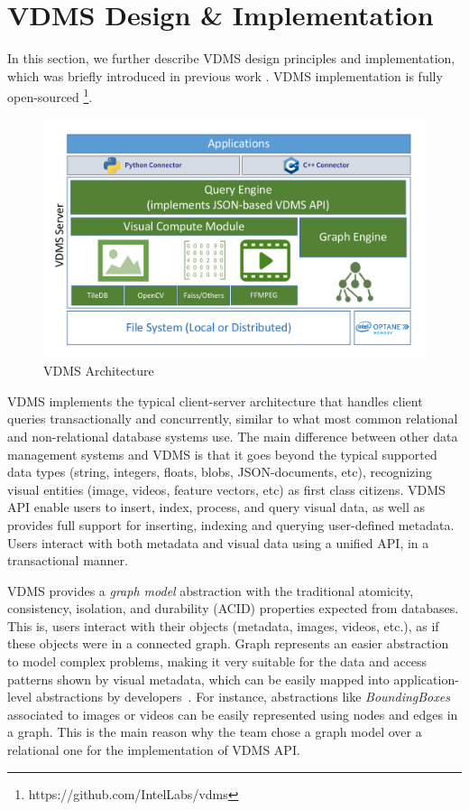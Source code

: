 \section{VDMS Design \& Implementation}
\label{arch}

In this section, we further describe VDMS design principles and implementation,
which was briefly introduced in previous work \cite{vdms-nips}.
VDMS implementation is fully open-sourced
\footnote{https://github.com/IntelLabs/vdms}.

\begin{figure}
\centering
\includegraphics[width=1\columnwidth]{figures/vdms_arch.pdf}
\caption{VDMS Architecture}
\label{fig:arch}
\end{figure}

VDMS implements the typical client-server architecture that handles
client queries transactionally and concurrently, similar to what most common
relational and non-relational database systems
\cite{mysql, postgresql, chang2008bigtable} use.
The main difference between other data management systems and VDMS is that
it goes beyond the typical supported data types (string, integers, floats,
blobs, JSON-documents, etc), recognizing visual entities (image, videos,
feature vectors, etc) as first class citizens.
VDMS API enable users to insert, index, process, and query visual data,
as well as provides full support for inserting, indexing and querying
user-defined metadata.
Users interact with both metadata and visual data using a unified API,
in a transactional manner.

VDMS provides a \textit{graph model} abstraction with the traditional
atomicity, consistency, isolation, and durability
(ACID) properties expected from databases.
This is, users interact with their objects (metadata, images, videos, etc.),
as if these objects were in a connected graph.
Graph represents an easier abstraction to model complex problems,
making it very suitable for the data and access patterns shown by visual metadata,
which can be easily mapped into application-level abstractions by
developers~\cite{tao}.
For instance, abstractions like \textit{BoundingBoxes} associated to
images or videos can be easily represented using nodes and edges in a graph.
This is the main reason why the team chose a graph model over a
relational one for the implementation of VDMS API.

